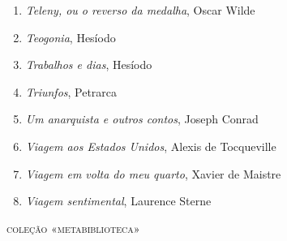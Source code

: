 \begin{enumerate}
\item \textit{Teleny, ou o reverso da medalha}, Oscar Wilde
\item \textit{Teogonia}, Hesíodo
\item \textit{Trabalhos e dias}, Hesíodo
\item \textit{Triunfos}, Petrarca
\item \textit{Um anarquista e outros contos}, Joseph Conrad
\item \textit{Viagem aos Estados Unidos}, Alexis de Tocqueville
\item \textit{Viagem em volta do meu quarto}, Xavier de Maistre 
\item \textit{Viagem sentimental}, Laurence Sterne
\end{enumerate}


\medskip
{\large\textsc{coleção «metabiblioteca»}}



